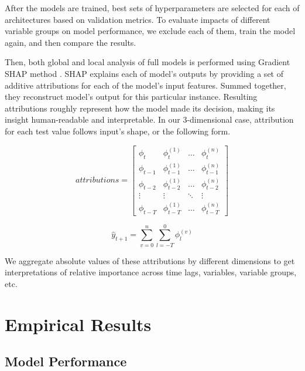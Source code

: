 \documentclass[review, authoryear]{elsarticle}
\begin{document}
After the models are trained, best sets of hyperparameters are selected for each of architectures based on validation metrics. To evaluate impacts of different variable groups on model performance, we exclude each of them, train the model again, and then compare the results.

Then, both global and local analysis of full models is performed using Gradient SHAP method \citep{lundberg_unified_2017}. SHAP explains each of model's outputs by providing a set of additive attributions for each of the model's input features. Summed together, they reconstruct model's output for this particular instance. Resulting attributions roughly represent how the model made its decision, making its insight human-readable and interpretable. In our 3-dimensional case, attribution for each test value follows input's shape, or the following form.

\begin{equation}
attributions = \begin{bmatrix} 
    \phi_{t} & \phi^{(1)}_{t} & \dots & \phi^{(n)}_{t} \\[1ex]
    \phi_{t-1} & \phi^{(1)}_{t-1} & \dots & \phi^{(n)}_{t-1} \\[1ex]
    \phi_{t-2} & \phi^{(1)}_{t-2} & \dots & \phi^{(n)}_{t-2} \\[1ex]
    \vdots & \vdots & \ddots & \vdots \\[1ex]
    \phi_{t-T} & \phi^{(1)}_{t-T} & \dots & \phi^{(n)}_{t-T} 
\end{bmatrix}
\end{equation}

\begin{equation}
\hat{y}_{t+1} = \sum_{v=0}^{n} \sum_{l=-T}^{0} \phi^{(v)}_l
\end{equation}

We aggregate absolute values of these attributions by different dimensions to get interpretations of relative importance across time lags, variables, variable groups, etc.

\section{Empirical Results}

\subsection{Model Performance}
\noindent
\end{document}
